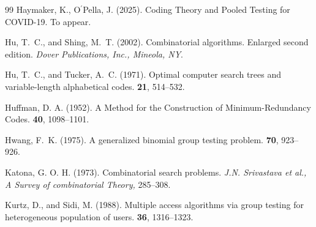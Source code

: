 \documentclass[12pt]{article}
\begin{document}
\begin{thebibliography}{99}
Haymaker, K., O$^{'}$Pella, J. (2025).
\newblock Coding Theory and Pooled Testing for COVID-19.
 To appear.



Hu, T.~C., and Shing, M.~T. (2002).
\newblock Combinatorial algorithms. Enlarged second edition.
{\it Dover Publications, Inc., Mineola, NY}.

Hu, T.~C., and Tucker, A.~C. (1971).
\newblock Optimal computer search trees and variable-length alphabetical codes.
 {\textbf{21},} 514--532.





Huffman, D. A. (1952).
\newblock A Method for the Construction of Minimum-Redundancy Codes.
 {\textbf{40},} 1098--1101.


Hwang, F.~K. (1975).
\newblock A generalized binomial group testing problem.
 {\textbf{70},} 923--926.



Katona, G. O. H. (1973).
\newblock
Combinatorial search problems.
\newblock
{\it J.N. Srivastava et al., A Survey of combinatorial Theory,} 285--308.



Kurtz, D., and Sidi, M. (1988).
\newblock Multiple access algorithms via group testing for heterogeneous population of users.
 {\textbf{36},} 1316--1323.



\end{thebibliography}
\end{document}
